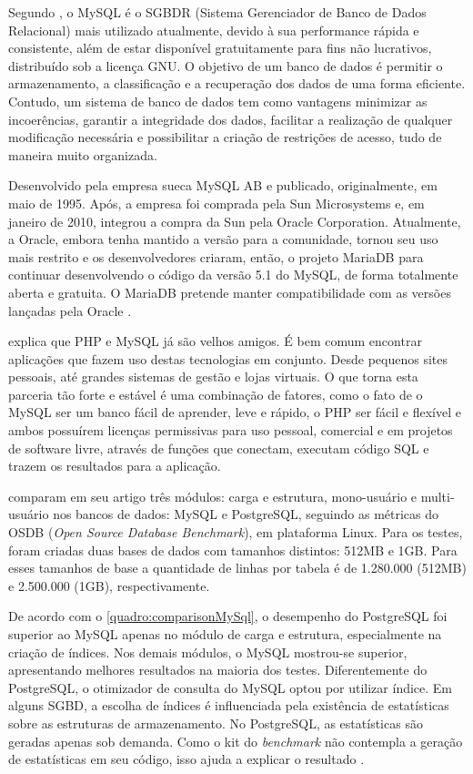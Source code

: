 Segundo , o MySQL é o SGBDR (Sistema Gerenciador de Banco de Dados Relacional) mais utilizado atualmente, devido à sua performance rápida e consistente, além de estar disponível gratuitamente para fins não lucrativos, distribuído sob a licença GNU. O objetivo de um banco de dados é permitir o armazenamento, a classificação e a recuperação dos dados de uma forma eficiente. Contudo, um sistema de banco de dados tem como vantagens minimizar as incoerências, garantir a integridade dos dados, facilitar a realização de qualquer modificação necessária e possibilitar a criação de restrições de acesso, tudo de maneira muito organizada.

\newpage
Desenvolvido pela empresa sueca MySQL AB e publicado, originalmente, em maio de 1995. Após, a empresa foi comprada pela Sun Microsystems e, em janeiro de 2010, integrou a compra da Sun pela Oracle Corporation. Atualmente, a Oracle, embora tenha mantido a versão para a comunidade, tornou seu uso mais restrito e os desenvolvedores criaram, então, o projeto MariaDB para continuar desenvolvendo o código da versão 5.1 do MySQL, de forma totalmente aberta e gratuita. O MariaDB pretende manter compatibilidade com as versões lançadas pela Oracle \cite{mariadb}.

 explica que PHP e MySQL já são velhos amigos. É bem comum encontrar aplicações que fazem uso destas tecnologias em conjunto. Desde pequenos sites pessoais, até grandes sistemas de gestão e lojas virtuais. O que torna esta parceria tão forte e estável é uma combinação de fatores, como o fato de o MySQL ser um banco fácil de aprender, leve e rápido, o PHP ser fácil e flexível e ambos possuírem licenças permissivas para uso pessoal, comercial e em projetos de software livre, através de funções que conectam, executam código SQL e trazem os resultados para a aplicação.

 comparam em seu artigo três módulos: carga e estrutura, mono-usuário e multi-usuário nos bancos de dados: MySQL e PostgreSQL, seguindo as métricas do OSDB (\textit{Open Source Database Benchmark}), em plataforma Linux. Para os testes, foram criadas duas bases de dados com tamanhos distintos: 512MB e 1GB. Para esses tamanhos de base a quantidade de linhas por tabela é de 1.280.000 (512MB) e 2.500.000 (1GB), respectivamente.

De acordo com o \autoref{quadro:comparisonMySql}, o desempenho do PostgreSQL foi superior ao MySQL apenas no módulo de carga e estrutura, especialmente na criação de índices. Nos demais módulos, o MySQL mostrou-se superior, apresentando melhores resultados na maioria dos testes. Diferentemente do PostgreSQL, o otimizador de consulta do MySQL optou por utilizar índice. Em alguns SGBD, a escolha de índices é influenciada pela existência de estatísticas sobre as estruturas de armazenamento. No PostgreSQL, as estatísticas são geradas apenas sob demanda. Como o kit do \textit{benchmark} não contempla a geração de estatísticas em seu código, isso ajuda a explicar o resultado \cite{mysql:ufpe}.

